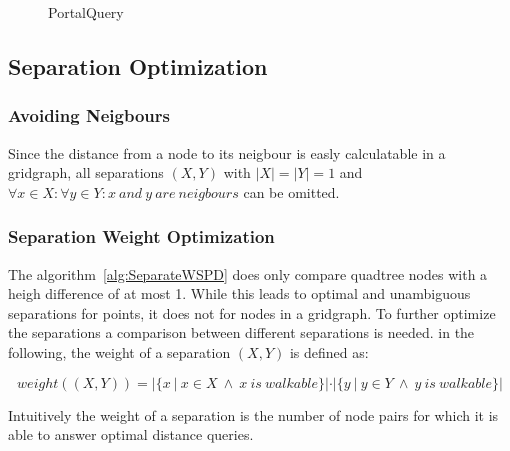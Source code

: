 \documentclass{article}
\begin{document}
\begin{figure}[ht!]
  \begin{algorithm}[H]




    \caption{PortalQuery}
    \label{alg:PortalQuery}
  \end{algorithm}
\end{figure}

\subsection{Separation Optimization}
\subsubsection{Avoiding Neigbours}
Since the distance from a node to its neigbour is easly calculatable in a gridgraph, all separations $(X, Y)$ with $|X| = |Y| = 1$
and $\forall x \in X: \forall y \in Y: x~and~y~are~neigbours$  can be omitted.

\subsubsection{Separation Weight Optimization}
The algorithm~\ref{alg:SeparateWSPD} does only compare quadtree nodes with a heigh difference of at most 1.
While this leads to optimal and unambiguous separations for points, it does not for nodes in a gridgraph.
To further optimize the separations a comparison between different separations is needed.
in the following, the weight of a separation $(X, Y)$ is defined as:

\begin{equation*}
  weight((X, Y)) = |\{x~|~x \in X~\land~x~is~walkable\}| \cdot |\{y~|~y \in Y~\land~y~is~walkable\}|
\end{equation*}

Intuitively the weight of a separation is the number of node pairs for which it is able to answer optimal distance queries.
\end{document}
